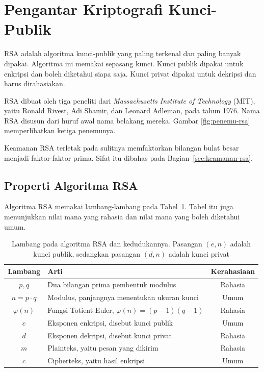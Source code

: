 \section{Pengantar Kriptografi Kunci-Publik}
\label{sec:pengantar-kunci-publik}

RSA adalah algoritma kunci-publik yang paling terkenal dan paling banyak
dipakai. Algoritma ini memakai sepasang kunci. Kunci publik dipakai untuk
enkripsi dan boleh diketahui siapa saja. Kunci privat dipakai untuk dekripsi
dan harus dirahasiakan.

RSA dibuat oleh tiga peneliti dari \textit{Massachusetts Institute of
Technology} (MIT), yaitu Ronald Rivest, Adi Shamir, dan Leonard Adleman, pada
tahun 1976. Nama RSA disusun dari huruf awal nama belakang mereka. Gambar
\ref{fig:penemu-rsa} memperlihatkan ketiga penemunya.

Keamanan RSA terletak pada sulitnya memfaktorkan bilangan bulat besar menjadi
faktor-faktor prima. Sifat itu dibahas pada Bagian~\ref{sec:keamanan-rsa}.

\subsection{Properti Algoritma RSA}

Algoritma RSA memakai lambang-lambang pada Tabel~\ref{tab:properti-rsa}.
Tabel itu juga menunjukkan nilai mana yang rahasia dan nilai mana yang boleh
diketahui umum.

\begin{table}[htbp]
    \centering
    \begin{tabularx}{\linewidth}{@{}c >{\raggedright\arraybackslash}X c@{}}
    \toprule
    \textbf{Lambang} & \textbf{Arti} & \textbf{Kerahasiaan} \\
    \midrule
    $p, q$      & Dua bilangan prima pembentuk modulus & Rahasia \\
    $n = p \cdot q$ & Modulus, panjangnya menentukan ukuran kunci & Umum \\
    $\varphi(n)$ & Fungsi Totient Euler, $\varphi(n)=(p-1)(q-1)$ & Rahasia \\
    $e$         & Eksponen enkripsi, disebut kunci publik & Umum \\
    $d$         & Eksponen dekripsi, disebut kunci privat & Rahasia \\
    $m$         & Plainteks, yaitu pesan yang dikirim & Rahasia \\
    $c$         & Cipherteks, yaitu hasil enkripsi & Umum \\
    \bottomrule
    \end{tabularx}
    \caption{Lambang pada algoritma RSA dan kedudukannya. Pasangan $(e, n)$
    adalah kunci publik, sedangkan pasangan $(d, n)$ adalah kunci privat}
    \label{tab:properti-rsa}
\end{table}

